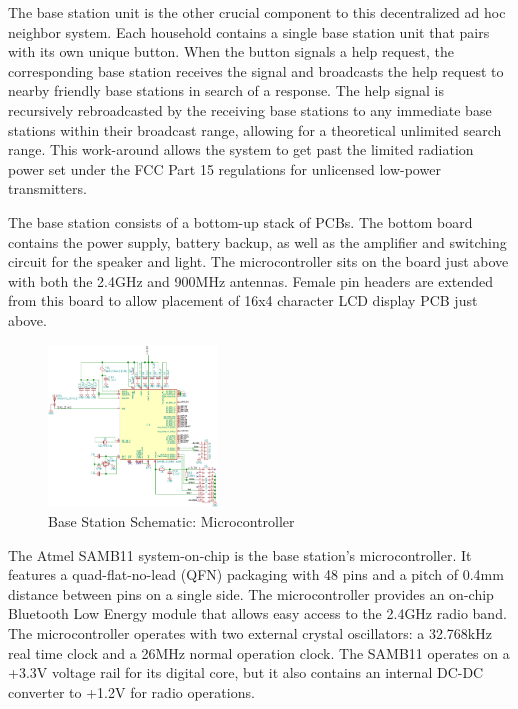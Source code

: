 \documentclass[journal,compsoc]{IEEEtran}
\begin{document}
The base station unit is the other crucial component to this decentralized ad hoc neighbor system. Each household contains a single base station unit that pairs with its own unique button. When the button signals a help request, the corresponding base station receives the signal and broadcasts the help request to nearby friendly base stations in search of a response. The help signal is recursively rebroadcasted by the receiving base stations to any immediate base stations within their broadcast range, allowing for a theoretical unlimited search range. This work-around allows the system to get past the limited radiation power set under the FCC Part 15 regulations for unlicensed low-power transmitters.

The base station consists of a bottom-up stack of PCBs. The bottom board contains the power supply, battery backup, as well as the amplifier and switching circuit for the speaker and light. The microcontroller sits on the board just above with both the 2.4GHz and 900MHz antennas. Female pin headers are extended from this board to allow placement of 16x4 character LCD display PCB just above.

\begin{figure}[ht] 	%
\centering
\includegraphics[width=0.4\textwidth]{base-schematic-uc.png}
\caption{ \space Base Station Schematic: Microcontroller}
\label{base-sch-uc}
\end{figure}

The Atmel SAMB11 system-on-chip is the base station's microcontroller. It features a quad-flat-no-lead (QFN) packaging with 48 pins and a pitch of 0.4mm distance between pins on a single side. The microcontroller provides an on-chip Bluetooth Low Energy module that allows easy access to the 2.4GHz radio band. The microcontroller operates with two external crystal oscillators: a 32.768kHz real time clock and a 26MHz normal operation clock. The SAMB11 operates on a +3.3V voltage rail for its digital core, but it also contains an internal DC-DC converter to +1.2V for radio operations.
\end{document}
